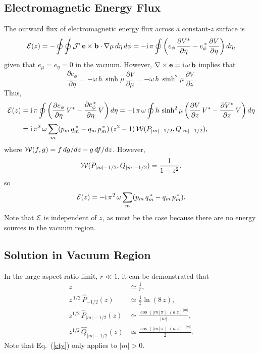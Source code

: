 \documentclass[12pt,prb,aps]{revtex4-1}
\begin{document}
\subsection{Electromagnetic Energy Flux}
The outward flux of electromagnetic energy flux across a constant-$z$ surface is
\begin{align}
{\cal E}(z) = -\oint\oint {\cal J}'\,{\bf e}\times {\bf b}\cdot\nabla \mu\,d\eta\,d\phi= -{\rm i}\,\pi\oint\left(e_\phi\,\frac{\partial V^\ast}{\partial\eta}
- e_\phi^{\,\ast}\,\frac{\partial V}{\partial\eta}\right)d\eta,
\end{align}
given that $e_\mu=e_\eta=0$ in the vacuum. 
However, $\nabla\times{\bf e}= {\rm i}\,\omega\,{\bf b}$ implies that
\begin{equation}
\frac{\partial e_\phi}{\partial\eta} = - \omega\,h\,\sinh\mu\,\frac{\partial V}{\partial \mu}= - \omega\,h\,\sinh^2\mu\,\frac{\partial V}{\partial z}. 
\end{equation}
Thus,
\begin{align}
{\cal E}(z) &= {\rm i}\,\pi\oint\left(\frac{\partial e_\phi}{\partial\eta}\,V^\ast - \frac{\partial e_\phi^{\,\ast}}{\partial\eta}\,V\right)d\eta= 
-{\rm i}\,\pi\,\omega\oint h\,\sinh^2\mu\left(\frac{\partial V}{\partial z}\,V^\ast - \frac{\partial V^\ast}{\partial z}\,V\right) d\eta\nonumber\\[0.5ex]
&= {\rm i}\,\pi^2\,\omega\sum_m(p_m\,q_m^{\,\ast}-q_m\,p_m^{\,\ast})\,(z^2-1)\,{\cal W}(P_{|m|-1/2},Q_{|m|-1/2}),
 \end{align}
 where ${\cal W}(f,g)= f\,dg/dz-g\,df/dz$. However,\cite{mf2}
 \begin{equation}
 {\cal W}(P_{|m|-1/2},Q_{|m|-1/2}) = \frac{1}{1-z^2},
 \end{equation}
 so
 \begin{equation}\label{e168g}
 {\cal E}(z)=- {\rm i}\,\pi^2\,\omega\sum_m(p_m\,q_m^{\,\ast}-q_m\,p_m^{\,\ast}).
 \end{equation}
 Note that ${\cal E}$ is independent of $z$, as must be the case because there are no energy sources in the vacuum region. 

\subsection{Solution in Vacuum Region}
In the large-aspect ratio limit, $r\ll 1$, it can be demonstrated that\,\cite{mf2}
\begin{align}
z&\simeq \frac{1}{r},\label{e25t}\\[0.5ex]
z^{\,1/2}\,\hat{P}_{-1/2}(z) &\simeq \frac{1}{2}\ln(8\,z),\\[0.5ex]
z^{1/2}\,\hat{P}_{|m|-1/2}(z) &\simeq \frac{\cos(|m|\,\pi)\,(a\,z)^{|m|}}{|m|},\label{ety}\\[0.5ex]
z^{1/2}\,\hat{Q}_{|m|-1/2}(z) &\simeq \frac{\cos(|m|\,\pi)\,(a\,z)^{-|m|}}{2}.\label{e29t}
\end{align}
Note that Eq.~(\ref{ety}) only applies to $|m|>0$.
\end{document}
